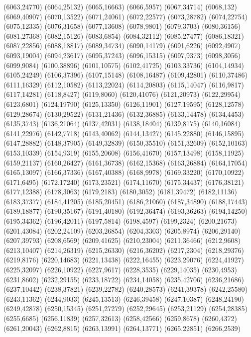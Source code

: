 (6063,24770)
(6064,25132)
(6065,16663)
(6066,5957)
(6067,34714)
(6068,132)
(6069,40907)
(6070,13522)
(6071,24061)
(6072,22577)
(6073,28782)
(6074,22754)
(6075,12335)
(6076,31658)
(6077,13608)
(6078,9801)
(6079,3703)
(6080,36156)
(6081,27368)
(6082,15126)
(6083,6854)
(6084,32112)
(6085,27477)
(6086,18321)
(6087,22856)
(6088,18817)
(6089,34734)
(6090,14179)
(6091,6226)
(6092,4907)
(6093,19004)
(6094,23617)
(6095,37243)
(6096,15315)
(6097,9373)
(6098,3056)
(6099,9084)
(6100,38896)
(6101,10575)
(6102,41725)
(6103,33736)
(6104,14934)
(6105,24249)
(6106,37396)
(6107,15148)
(6108,16487)
(6109,42801)
(6110,37486)
(6111,16329)
(6112,10582)
(6113,22024)
(6114,20803)
(6115,14047)
(6116,9817)
(6117,14281)
(6118,8427)
(6119,8060)
(6120,41076)
(6121,20973)
(6122,29954)
(6123,6801)
(6124,19790)
(6125,13350)
(6126,11901)
(6127,19595)
(6128,12578)
(6129,28674)
(6130,29522)
(6131,21436)
(6132,36885)
(6133,14478)
(6134,4453)
(6135,3743)
(6136,21064)
(6137,42031)
(6138,18404)
(6139,8175)
(6140,16084)
(6141,22976)
(6142,7718)
(6143,40062)
(6144,13427)
(6145,22880)
(6146,15895)
(6147,28882)
(6148,37905)
(6149,32839)
(6150,35510)
(6151,32609)
(6152,10163)
(6153,10339)
(6154,9319)
(6155,20608)
(6156,41670)
(6157,13498)
(6158,11925)
(6159,21137)
(6160,26427)
(6161,36738)
(6162,15368)
(6163,26884)
(6164,17054)
(6165,13097)
(6166,37336)
(6167,40388)
(6168,9978)
(6169,33220)
(6170,10922)
(6171,6495)
(6172,17240)
(6173,23521)
(6174,11670)
(6175,34437)
(6176,38121)
(6177,12388)
(6178,3063)
(6179,2183)
(6180,3052)
(6181,39472)
(6182,11136)
(6183,37377)
(6184,41205)
(6185,20451)
(6186,21060)
(6187,34890)
(6188,17443)
(6189,18877)
(6190,35167)
(6191,40180)
(6192,36474)
(6193,36263)
(6194,14250)
(6195,34362)
(6196,42011)
(6197,5814)
(6198,4597)
(6199,2324)
(6200,21673)
(6201,43084)
(6202,24109)
(6203,26854)
(6204,3303)
(6205,8974)
(6206,29140)
(6207,39793)
(6208,6569)
(6209,41625)
(6210,23004)
(6211,36466)
(6212,9608)
(6213,10407)
(6214,26319)
(6215,26330)
(6216,36202)
(6217,2304)
(6218,29376)
(6219,8176)
(6220,14683)
(6221,13438)
(6222,16455)
(6223,29076)
(6224,41927)
(6225,32097)
(6226,10922)
(6227,9617)
(6228,3535)
(6229,14035)
(6230,4953)
(6231,8602)
(6232,29155)
(6233,18722)
(6234,14058)
(6235,42706)
(6236,21686)
(6237,10442)
(6238,37821)
(6239,22782)
(6240,28573)
(6241,39378)
(6242,25580)
(6243,11362)
(6244,9033)
(6245,13513)
(6246,39458)
(6247,10387)
(6248,24190)
(6249,42878)
(6250,15345)
(6251,27279)
(6252,29645)
(6253,21129)
(6254,28385)
(6255,6685)
(6256,11839)
(6257,32613)
(6258,42566)
(6259,8678)
(6260,4372)
(6261,20043)
(6262,8815)
(6263,13991)
(6264,13771)
(6265,22851)
(6266,2539)
